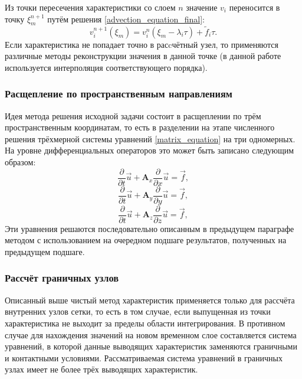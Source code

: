 Из точки пересечения характеристики со слоем $n$ значение $v_i$ переносится в 
точку $\xi^{n+1}_m$ путём решения \ref{advection_equation_final}:
$$v_i^{n+1}(\xi_m)=v^{n}_i(\xi_m-\lambda_i\tau) + {\tilde f}_i \tau.$$
Если характеристика не попадает точно в расcчётный узел, то применяются различные
методы реконструкции значения в данной точке (в данной работе используется
интерполяция соответствующего порядка).
\subsubsection{Расщепление по пространственным направлениям}				
Идея метода \cite{fedorenko} решения исходной задачи состоит в расщеплении по трём пространственным координатам, то есть в разделении на этапе численного решения трёхмерной системы уравнений \ref{matrix_equation} на три одномерных. На уровне дифференциальных операторов это может быть записано следующим образом:
\begin{equation}
\frac{\partial}{\partial t}\vec u+\mathbf{A}_x \frac{\partial}{\partial x}\vec u
= \vec f,
\label{matrix_equation_x}
\end{equation}
\begin{equation}
\frac{\partial}{\partial t}\vec u+\mathbf{A}_y \frac{\partial}{\partial y}\vec u
= \vec f,
\label{matrix_equation_y}
\end{equation}
\begin{equation}
\frac{\partial}{\partial t}\vec u+\mathbf{A}_z \frac{\partial}{\partial z}\vec u
= \vec f,
\label{matrix_equation_z}
\end{equation}
Эти уравнения решаются последовательно описанным в предыдущем параграфе методом с использованием
на очередном подшаге результатов, полученных на предыдущем подшаге.

\subsubsection{Рассчёт граничных узлов}
Описанный выше чистый метод характеристик применяется только для рассчёта внутренних узлов
сетки, то есть в том случае, если выпущенная из точки характеристика не
выходит за пределы области интегрирования. В противном случае для нахождения значений на новом временном слое  составляется система уравнений, в которой данные выводящих характеристик заменяются граничными и контактными условиями. Рассматриваемая система уравнений в граничных узлах имеет не более трёх
\cite{chelnokov} выводящих характеристик. 


